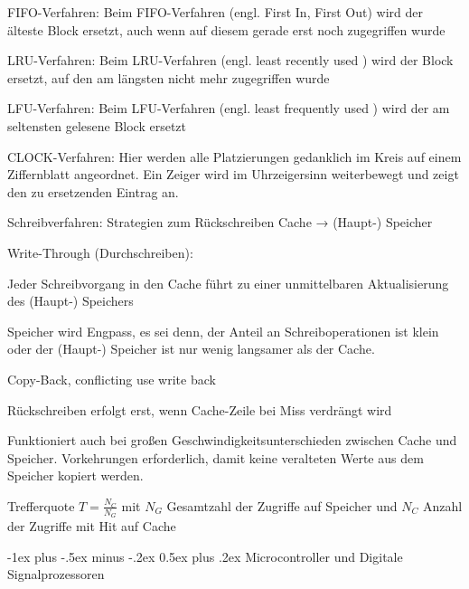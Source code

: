 \documentclass[10pt,landscape]{article}
\makeatletter
\renewcommand{\section}{\@startsection{section}{1}{0mm}%
                                {-1ex plus -.5ex minus -.2ex}%
                                {0.5ex plus .2ex}%
                                {\normalfont\large\bfseries}}
\makeatother
\begin{document}
\begin{multicols}{3}
\begin{itemize*}
    \item FIFO-Verfahren: Beim FIFO-Verfahren (engl. First In, First Out) wird der älteste Block ersetzt, auch wenn auf diesem gerade erst noch zugegriffen wurde
    \item LRU-Verfahren: Beim LRU-Verfahren (engl. least recently used ) wird der Block ersetzt, auf den am längsten nicht mehr zugegriffen wurde
    \item LFU-Verfahren: Beim LFU-Verfahren (engl. least frequently used ) wird der am seltensten gelesene Block ersetzt
    \item CLOCK-Verfahren: Hier werden alle Platzierungen gedanklich im Kreis auf einem Ziffernblatt angeordnet. Ein Zeiger wird im Uhrzeigersinn weiterbewegt und zeigt den zu ersetzenden Eintrag an.
  \end{itemize*}
  
  Schreibverfahren: Strategien zum Rückschreiben Cache → (Haupt-) Speicher
  \begin{itemize*}
    \item Write-Through (Durchschreiben): 
    \item  Jeder Schreibvorgang in den Cache führt zu einer unmittelbaren Aktualisierung des (Haupt-) Speichers
    \item  Speicher wird Engpass, es sei denn, der Anteil an Schreiboperationen ist klein oder der (Haupt-) Speicher ist nur wenig langsamer als der Cache.
    \item Copy-Back, conflicting use write back
    \item Rückschreiben erfolgt erst, wenn Cache-Zeile bei Miss verdrängt wird
    \item Funktioniert auch bei großen Geschwindigkeitsunterschieden zwischen Cache und Speicher. Vorkehrungen erforderlich, damit keine veralteten Werte aus dem Speicher kopiert werden.
  \end{itemize*}
  
  Trefferquote $T=\frac{N_C}{N_G}$ mit $N_G$ Gesamtzahl der Zugriffe auf Speicher und $N_C$ Anzahl der Zugriffe mit Hit auf Cache
  
  
  \section{ Microcontroller und Digitale Signalprozessoren}

\end{multicols}
\end{document}
